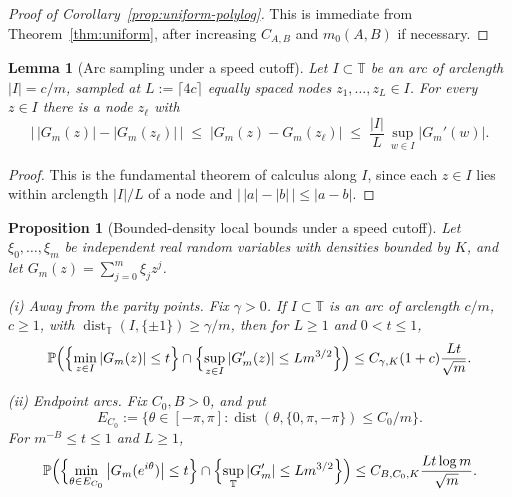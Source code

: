 \documentclass[11pt]{amsart}
\numberwithin{equation}{section}
\newtheorem{proposition}[theorem]{Proposition}
\newtheorem{lemma}[theorem]{Lemma}
\theoremstyle{definition}
\theoremstyle{remark}
\newcommand{\T}{\mathbb T}
\newcommand{\Prob}{\mathbb P}
\newcommand{\dist}{\operatorname{dist}}
\newcommand{\abs}[1]{\left\lvert #1\right\rvert}
\begin{document}
\begin{proof}[Proof of Corollary~\ref{prop:uniform-polylog}]
This is immediate from Theorem~\ref{thm:uniform}, after increasing
\(C_{A,B}\) and \(m_0(A,B)\) if necessary.
\end{proof}

\begin{lemma}[Arc sampling under a speed cutoff]\label{lem:arcsampling}
Let $I\subset\T$ be an arc of arclength $\abs I=c/m$, sampled at $L:=\lceil 4c\rceil$ equally spaced nodes $z_1,\dots,z_L\in I$. For every $z\in I$ there is a node $z_\ell$ with
\[
  \bigl|\,\abs{G_m(z)}-\abs{G_m(z_\ell)}\,\bigr|\;\le\;\abs{G_m(z)-G_m(z_\ell)}\;\le\;\frac{\abs I}{L}\,\sup_{w\in I}\abs{G_m'(w)}.
\]
\end{lemma}

\begin{proof}
This is the fundamental theorem of calculus along \(I\), since each \(z\in I\)
lies within arclength \(\abs I/L\) of a node and
\(\abs{\,\abs a-\abs b\,}\le\abs{a-b}\).
\end{proof}

\begin{proposition}[Bounded-density local bounds under a speed cutoff]\label{prop:bd-speed}
Let \(\xi_0,\ldots,\xi_m\) be independent real random variables with densities
bounded by \(K\), and let \(G_m(z)=\sum_{j=0}^m\xi_jz^j\).

\emph{(i) Away from the parity points.}  Fix \(\gamma>0\).  If \(I\subset\T\)
is an arc of arclength \(c/m\), \(c\ge1\), with
\(\dist_\T(I,\{\pm1\})\ge\gamma/m\), then for \(L\ge1\) and \(0<t\le1\),
\[
  \Prob\Bigl(
    \Bigl\{\min_{z\in I}\abs{G_m(z)}\le t\Bigr\}
    \cap
    \Bigl\{\sup_{z\in I}\abs{G_m'(z)}\le Lm^{3/2}\Bigr\}
  \Bigr)
  \le C_{\gamma,K}(1+c)\frac{Lt}{\sqrt m}.
\]

\emph{(ii) Endpoint arcs.}  Fix \(C_0,B>0\), and put
\[
  E_{C_0}:=\{\theta\in[-\pi,\pi]:
  \dist(\theta,\{0,\pi,-\pi\})\le C_0/m\}.
\]
For \(m^{-B}\le t\le1\) and \(L\ge1\),
\[
  \Prob\Bigl(
    \Bigl\{\min_{\theta\in E_{C_0}}\abs{G_m(e^{i\theta})}\le t\Bigr\}
    \cap
    \Bigl\{\sup_{\T}\abs{G_m'}\le Lm^{3/2}\Bigr\}
  \Bigr)
  \le C_{B,C_0,K}\frac{Lt\log m}{\sqrt m}.
\]
\end{proposition}
\end{document}
